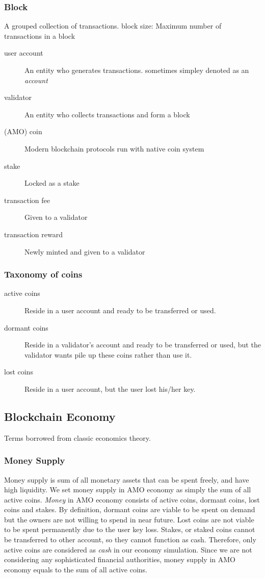\documentclass[a4paper,11pt]{scrartcl}
\begin{document}
\subsubsection{Block}
A grouped collection of transactions.
block size: Maximum number of transactions in a block

\begin{description}
	\item[user account]
		An entity who generates transactions. sometimes simpley denoted as an
		\emph{account}
	\item[validator]
		An entity who collects transactions and form a block
	\item[(AMO) coin]
		Modern blockchain protocols run with native coin system
	\item[stake]
		Locked as a stake
	\item[transaction fee]
		Given to a validator
	\item[transaction reward]
		Newly minted and given to a validator
\end{description}

\subsubsection{Taxonomy of coins}
\begin{description}
	\item[active coins]
		Reside in a user account and ready to be transferred or used.
	\item[dormant coins]
		Reside in a validator's account and ready to be transferred or used,
		but the validator wants pile up these coins rather than use it.
	\item[lost coins]
		Reside in a user account, but the user lost his/her key.
\end{description}

\subsection{Blockchain Economy}
Terms borrowed from classic economics theory.

\subsubsection{Money Supply}
Money supply is sum of all monetary assets that can be spent freely, and have
high liquidity. We set money supply in AMO economy as simply the sum of all
active coins. \emph{Money} in AMO economy consists of active coins, dormant
coins, lost coins and stakes. By definition, dormant coins are viable to be
spent on demand but the owners are not willing to spend in near future. Lost
coins are not viable to be spent permanently due to the user key loss. Stakes,
or staked coins cannot be transferred to other account, so they cannot function
as cash. Therefore, only active coins are considered as \emph{cash} in our
economy simulation. Since we are not considering any sophisticated financial
authorities, money supply in AMO economy equals to the sum of all active coins.
\end{document}
